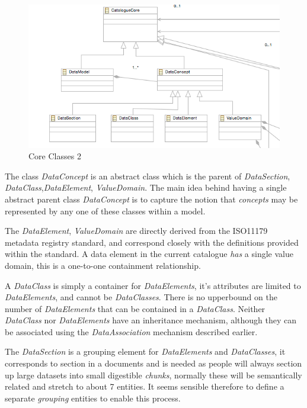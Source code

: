 \documentclass{article}
\begin{document}
\begin{figure}[here]
\includegraphics[scale=0.4]{images/core2}
\caption{Core Classes 2} 
\label{fig:core2}
\end{figure}

The class \emph{DataConcept} is an abstract class which is the parent of \emph{DataSection}, \emph{DataClass},\emph{DataElement}, \emph{ValueDomain}. The main idea behind having a single abstract parent class  \emph{DataConcept}  is to capture the notion that \emph{concepts} may be represented by any one of these classes within a model.  

The \emph{DataElement}, \emph{ValueDomain} are directly derived from the ISO11179 metadata registry standard, and correspond closely with the definitions provided within the standard. A data element in the current catalogue \emph{has} a single value domain, this is a one-to-one containment relationship. 

A \emph{DataClass} is simply a container for \emph{DataElements}, it's attributes are limited to \emph{DataElements}, and cannot be  \emph{DataClasses}. There is no upperbound on the number of \emph{DataElements} that can be contained in a \emph{DataClass}. Neither \emph{DataClass} nor \emph{DataElements} have an inheritance mechanism, although they can be associated using the \emph{DataAssociation} mechanism described earlier.

The \emph{DataSection} is a grouping element for \emph{DataElements} and \emph{DataClasses}, it corresponds to section in a documents and is needed as people will always section up large datasets into small digestible \emph{chunks}, normally these will be semantically related and stretch to about 7 entities. It seems sensible therefore to define a separate \emph{grouping} entities to enable this process. 
\end{document}
